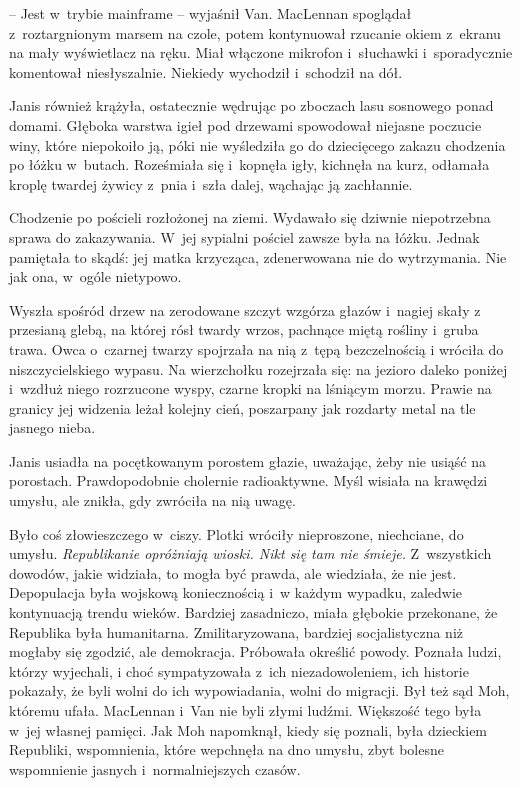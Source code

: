 \documentclass[oneside,polish,11pt,sfheadings]{mwbk}
\begin{document}
-- Jest w~trybie mainframe -- wyjaśnił Van. MacLennan spoglądał z~roztargnionym marsem na czole, potem kontynuował rzucanie okiem z~ekranu
na mały wyświetlacz na ręku. Miał włączone mikrofon i~słuchawki i~sporadycznie komentował niesłyszalnie. Niekiedy wychodził i~schodził na
dół.

Janis również krążyła, ostatecznie wędrując po zboczach lasu sosnowego
ponad domami. Głęboka warstwa igieł pod drzewami spowodował niejasne
poczucie winy, które niepokoiło ją, póki nie wyśledziła go do
dziecięcego zakazu chodzenia po łóżku w~butach. Roześmiała się i~kopnęła
igły, kichnęła na kurz, odłamała kroplę twardej żywicy z~pnia i~szła
dalej, wąchając ją zachłannie.

Chodzenie po pościeli rozłożonej na ziemi. Wydawało się dziwnie
niepotrzebna sprawa do zakazywania. W~jej sypialni pościel zawsze była
na łóżku. Jednak pamiętała to skądś: jej matka krzycząca, zdenerwowana
nie do wytrzymania. Nie jak ona, w~ogóle nietypowo.

Wyszła spośród drzew na zerodowane szczyt wzgórza głazów i~nagiej skały
z przesianą glebą, na której rósł twardy wrzos, pachnące miętą rośliny i~gruba trawa. Owca o~czarnej twarzy spojrzała na nią z~tępą bezczelnością
i wróciła do niszczycielskiego wypasu. Na wierzchołku rozejrzała się: na
jezioro daleko poniżej i~wzdłuż niego rozrzucone wyspy, czarne kropki na
lśniącym morzu. Prawie na granicy jej widzenia leżał kolejny cień,
poszarpany jak rozdarty metal na tle jasnego nieba.

Janis usiadła na pocętkowanym porostem głazie, uważając, żeby nie usiąść
na porostach. Prawdopodobnie cholernie radioaktywne. Myśl wisiała na
krawędzi umysłu, ale znikła, gdy zwróciła na nią uwagę.

Było coś złowieszczego w~ciszy. Plotki wróciły nieproszone, niechciane,
do umysłu. \emph{Republikanie opróżniają wioski. Nikt się tam nie
śmieje.} Z~wszystkich dowodów, jakie widziała, to mogła być prawda, ale
wiedziała, że nie jest. Depopulacja była wojskową koniecznością i~w każdym wypadku, zaledwie kontynuacją trendu wieków. Bardziej zasadniczo,
miała głębokie przekonane, że Republika była humanitarna.
Zmilitaryzowana, bardziej socjalistyczna niż mogłaby się zgodzić, ale
demokracja. Próbowała określić powody. Poznała ludzi, którzy wyjechali,
i choć sympatyzowała z~ich niezadowoleniem, ich historie pokazały, że
byli wolni do ich wypowiadania, wolni do migracji. Był też sąd Moh,
któremu ufała. MacLennan i~Van nie byli złymi ludźmi. Większość tego
była w~jej własnej pamięci. Jak Moh napomknął, kiedy się poznali, była
dzieckiem Republiki, wspomnienia, które wepchnęła na dno umysłu, zbyt
bolesne wspomnienie jasnych i~normalniejszych czasów.
\end{document}
